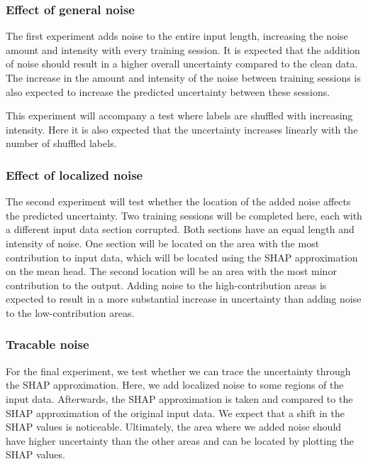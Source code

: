 \subsubsection{Effect of general noise}

The first experiment adds noise to the entire input length, increasing the noise amount and intensity with every training session. It is expected that the addition of noise should result in a higher overall uncertainty compared to the clean data. The increase in the amount and intensity of the noise between training sessions is also expected to increase the predicted uncertainty between these sessions.

This experiment will accompany a test where labels are shuffled with increasing intensity. Here it is also expected that the uncertainty increases linearly with the number of shuffled labels. 

\subsubsection{Effect of localized noise}

The second experiment will test whether the location of the added noise affects the predicted uncertainty. Two training sessions will be completed here, each with a different input data section corrupted. Both sections have an equal length and intensity of noise. One section will be located on the area with the most contribution to input data, which will be located using the SHAP approximation on the mean head. The second location will be an area with the most minor contribution to the output. Adding noise to the high-contribution areas is expected to result in a more substantial increase in uncertainty than adding noise to the low-contribution areas.

\subsubsection{Tracable noise}

For the final experiment, we test whether we can trace the uncertainty through the SHAP approximation. Here, we add localized noise to some regions of the input data. Afterwards, the SHAP approximation is taken and compared to the SHAP approximation of the original input data. We expect that a shift in the SHAP values is noticeable. Ultimately, the area where we added noise should have higher uncertainty than the other areas and can be located by plotting the SHAP values.
